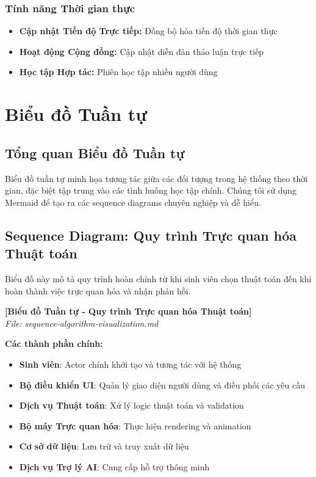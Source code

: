 \subsubsection{Tính năng Thời gian thực}
\begin{itemize}
    \item \textbf{Cập nhật Tiến độ Trực tiếp:} Đồng bộ hóa tiến độ thời gian thực
    \item \textbf{Hoạt động Cộng đồng:} Cập nhật diễn đàn thảo luận trực tiếp
    \item \textbf{Học tập Hợp tác:} Phiên học tập nhiều người dùng
\end{itemize}

\section{Biểu đồ Tuần tự}
\label{sec:sequence-diagram}

\subsection{Tổng quan Biểu đồ Tuần tự}
\label{subsec:sequence-overview}

Biểu đồ tuần tự minh họa tương tác giữa các đối tượng trong hệ thống theo thời gian, đặc biệt tập trung vào các tình huống học tập chính. Chúng tôi sử dụng Mermaid để tạo ra các sequence diagrams chuyên nghiệp và dễ hiểu.

\subsection{Sequence Diagram: Quy trình Trực quan hóa Thuật toán}
\label{subsec:algorithm-visualization-sequence}

Biểu đồ này mô tả quy trình hoàn chỉnh từ khi sinh viên chọn thuật toán đến khi hoàn thành việc trực quan hóa và nhận phản hồi.

\begin{center}
\textbf{[Biểu đồ Tuần tự - Quy trình Trực quan hóa Thuật toán]}\\
\textit{File: sequence-algorithm-visualization.md}
\end{center}

\textbf{Các thành phần chính:}
\begin{itemize}
    \item \textbf{Sinh viên}: Actor chính khởi tạo và tương tác với hệ thống
    \item \textbf{Bộ điều khiển UI}: Quản lý giao diện người dùng và điều phối các yêu cầu
    \item \textbf{Dịch vụ Thuật toán}: Xử lý logic thuật toán và validation
    \item \textbf{Bộ máy Trực quan hóa}: Thực hiện rendering và animation
    \item \textbf{Cơ sở dữ liệu}: Lưu trữ và truy xuất dữ liệu
    \item \textbf{Dịch vụ Trợ lý AI}: Cung cấp hỗ trợ thông minh
\end{itemize}

